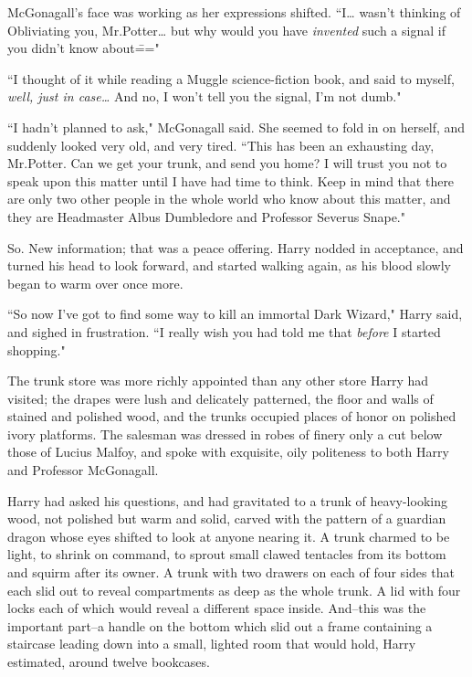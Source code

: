 McGonagall's face was working as her expressions shifted. ``I{\ldots} wasn't thinking of Obliviating you, Mr.\?Potter{\ldots} but why would you have \emph{invented} such a signal if you didn't know about\==="

``I thought of it while reading a Muggle science-fiction book, and said to myself, \emph{well, just in case{\ldots}} And no, I won't tell you the signal, I'm not dumb."

``I hadn't planned to ask," McGonagall said. She seemed to fold in on herself, and suddenly looked very old, and very tired. ``This has been an exhausting day, Mr.\?Potter. Can we get your trunk, and send you home? I will trust you not to speak upon this matter until I have had time to think. Keep in mind that there are only two other people in the whole world who know about this matter, and they are Headmaster Albus Dumbledore and Professor Severus Snape."

So. New information; that was a peace offering. Harry nodded in acceptance, and turned his head to look forward, and started walking again, as his blood slowly began to warm over once more.

``So now I've got to find some way to kill an immortal Dark Wizard," Harry said, and sighed in frustration. ``I really wish you had told me that \emph{before} I started shopping."

\later

The trunk store was more richly appointed than any other store Harry had visited; the drapes were lush and delicately patterned, the floor and walls of stained and polished wood, and the trunks occupied places of honor on polished ivory platforms. The salesman was dressed in robes of finery only a cut below those of Lucius Malfoy, and spoke with exquisite, oily politeness to both Harry and Professor McGonagall.

Harry had asked his questions, and had gravitated to a trunk of heavy-looking wood, not polished but warm and solid, carved with the pattern of a guardian dragon whose eyes shifted to look at anyone nearing it. A trunk charmed to be light, to shrink on command, to sprout small clawed tentacles from its bottom and squirm after its owner. A trunk with two drawers on each of four sides that each slid out to reveal compartments as deep as the whole trunk. A lid with four locks each of which would reveal a different space inside. And\---this was the important part\---a handle on the bottom which slid out a frame containing a staircase leading down into a small, lighted room that would hold, Harry estimated, around twelve bookcases.

